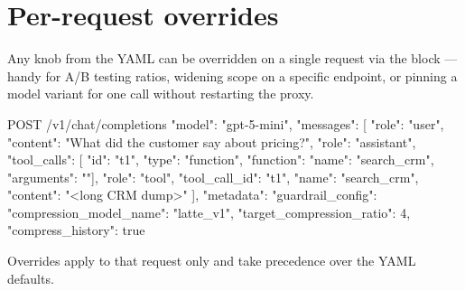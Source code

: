 \documentclass[10pt]{article}
\begin{document}
\section{Per-request overrides}

Any knob from the YAML can be overridden on a single request via the
 block — handy for A/B testing
ratios, widening scope on a specific endpoint, or pinning a model variant
for one call without restarting the proxy.

\begin{jsoncode}
POST /v1/chat/completions
{
  "model": "gpt-5-mini",
  "messages": [
    {"role": "user", "content": "What did the customer say about pricing?"},
    {"role": "assistant", "tool_calls": [
      {"id": "t1", "type": "function",
       "function": {"name": "search_crm", "arguments": "{}"}}]},
    {"role": "tool", "tool_call_id": "t1", "name": "search_crm",
     "content": "<long CRM dump>"}
  ],
  "metadata": {
    "guardrail_config": {
      "compression_model_name": "latte_v1",
      "target_compression_ratio": 4,
      "compress_history": true
    }
  }
}
\end{jsoncode}

Overrides apply to that request only and take precedence over the YAML
defaults.
\end{document}
